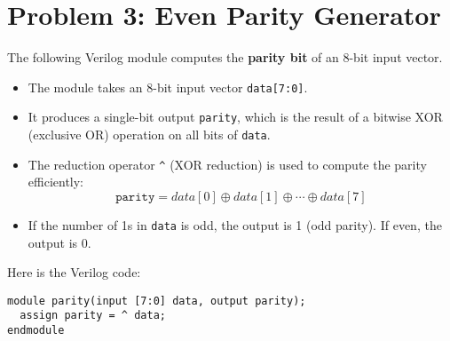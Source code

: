 \documentclass{article}
\begin{document}
\section*{Problem 3: Even Parity Generator}

The following Verilog module computes the \textbf{parity bit} of an 8-bit input vector.

\begin{itemize}
	\item The module takes an 8-bit input vector \texttt{data[7:0]}.
	\item It produces a single-bit output \texttt{parity}, which is the result of a bitwise XOR (exclusive OR) operation on all bits of \texttt{data}.
	\item The reduction operator \texttt{\^{}} (XOR reduction) is used to compute the parity efficiently:
	      \[
		      \texttt{parity} = data[0] \oplus data[1] \oplus \cdots \oplus data[7]
	      \]
	\item If the number of 1s in \texttt{data} is odd, the output is 1 (odd parity). If even, the output is 0.
\end{itemize}

\noindent Here is the Verilog code:

\begin{lstlisting}
module parity(input [7:0] data, output parity);
  assign parity = ^ data;
endmodule
\end{lstlisting}
\end{document}
